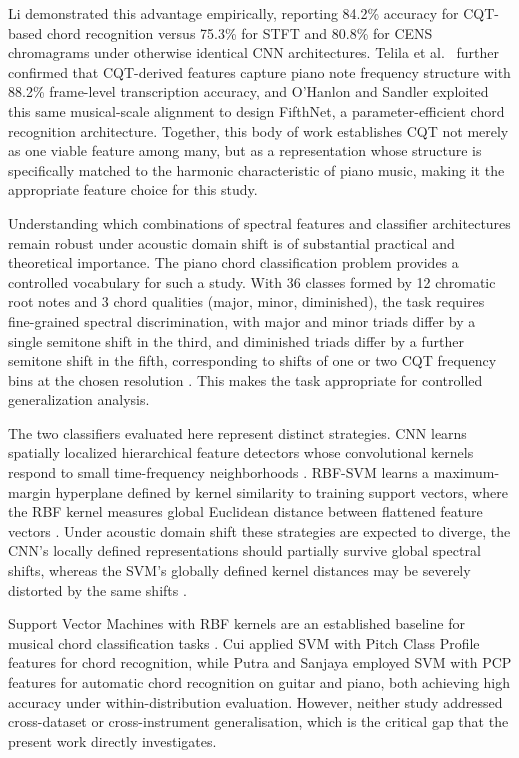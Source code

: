 \documentclass[pdflatex,sn-mathphys-num,iicol]{sn-jnl}
\theoremstyle{thmstyleone}
\theoremstyle{thmstyletwo}
\theoremstyle{thmstylethree}
\begin{document}
Li \cite{Li2021} demonstrated this advantage empirically, reporting 84.2\% accuracy for CQT-based chord recognition versus 75.3\% for STFT and 80.8\% for CENS chromagrams under otherwise identical CNN architectures. Telila et al.\ \cite{Telila2023} further confirmed that CQT-derived features capture piano note frequency structure with 88.2\% frame-level transcription accuracy, and O'Hanlon and Sandler \cite{OHanlon2021} exploited this same musical-scale alignment to design FifthNet, a parameter-efficient chord recognition architecture. Together, this body of work establishes CQT not merely as one viable feature among many, but as a representation whose structure is specifically matched to the harmonic characteristic of piano music, making it the appropriate feature choice for this study.

Understanding which combinations of spectral features and classifier architectures remain robust under acoustic domain shift is of substantial practical and theoretical importance. The piano chord classification problem provides a controlled vocabulary for such a study. With 36 classes formed by 12 chromatic root notes and 3 chord qualities (major, minor, diminished), the task requires fine-grained spectral discrimination, with major and minor triads differ by a single semitone shift in the third, and diminished triads differ by a further semitone shift in the fifth, corresponding to shifts of one or two CQT frequency bins at the chosen resolution \cite{Harte2010}. This makes the task appropriate for controlled generalization analysis.

The two classifiers evaluated here represent distinct strategies. CNN learns spatially localized hierarchical feature detectors whose convolutional kernels respond to small time-frequency neighborhoods \cite{OShea2015}\cite{Purwono2022}. RBF-SVM learns a maximum-margin hyperplane defined by kernel similarity to training support vectors, where the RBF kernel measures global Euclidean distance between flattened feature vectors \cite{Wainer2020}. Under acoustic domain shift these strategies are expected to diverge, the CNN's locally defined representations should partially survive global spectral shifts, whereas the SVM's globally defined kernel distances may be severely distorted by the same shifts \cite{Zaman2023}.

Support Vector Machines with RBF kernels are an established baseline for musical chord classification tasks \cite{Cui2022} \cite{Putra2025}. Cui \cite{Cui2022} applied SVM with Pitch Class Profile features for chord recognition, while Putra and Sanjaya \cite{Putra2025} employed SVM with PCP features for automatic chord recognition on guitar and piano, both achieving high accuracy under within-distribution evaluation. However, neither study addressed cross-dataset or cross-instrument generalisation, which is the critical gap that the present work directly investigates.
\end{document}
